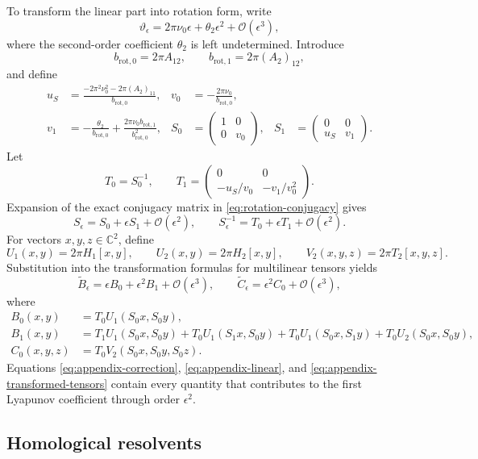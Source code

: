 \documentclass[11pt]{amsart}
\theoremstyle{remark}
\newcommand{\cO}{\mathcal{O}}
\begin{document}
To transform the linear part into rotation form, write
\[
 \vartheta_\epsilon
=2\pi\nu_0\epsilon+\theta_2\epsilon^2+\cO(\epsilon^3),
\]
where the second-order coefficient \(\theta_2\) is left undetermined.
Introduce
\[
 b_{\mathrm{rot},0}=2\pi A_{12},\qquad
 b_{\mathrm{rot},1}=2\pi(A_2)_{12},
\]
and define
\[
\begin{aligned}
u_S&=\frac{-2\pi^2\nu_0^2-2\pi(A_2)_{11}}{b_{\mathrm{rot},0}},
&
v_0&=-\frac{2\pi\nu_0}{b_{\mathrm{rot},0}},\\
v_1&=-\frac{\theta_2}{b_{\mathrm{rot},0}}
+\frac{2\pi\nu_0b_{\mathrm{rot},1}}{b_{\mathrm{rot},0}^2},
&
S_0&=\begin{pmatrix}1&0\\0&v_0\end{pmatrix},
&
S_1&=\begin{pmatrix}0&0\\u_S&v_1\end{pmatrix}.
\end{aligned}
\]
Let
\[
 T_0=S_0^{-1},\qquad
 T_1=
\begin{pmatrix}
0&0\\
-u_S/v_0&-v_1/v_0^2
\end{pmatrix}.
\]
Expansion of the exact conjugacy matrix in
\eqref{eq:rotation-conjugacy} gives
\[
 S_\epsilon=S_0+\epsilon S_1+\cO(\epsilon^2),
 \qquad
 S_\epsilon^{-1}=T_0+\epsilon T_1+\cO(\epsilon^2).
\]
For vectors \(x,y,z\in\mathbb{C}^2\), define
\[
 U_1(x,y)=2\pi H_1[x,y],\qquad
 U_2(x,y)=2\pi H_2[x,y],\qquad
 V_2(x,y,z)=2\pi T_2[x,y,z].
\]
Substitution into the transformation formulas for multilinear tensors yields
\begin{equation}\label{eq:appendix-transformed-tensors}
\widetilde B_\epsilon
=\epsilon B_0+\epsilon^2B_1+\cO(\epsilon^3),
\qquad
\widetilde C_\epsilon
=\epsilon^2C_0+\cO(\epsilon^3),
\end{equation}
where
\[
\begin{aligned}
B_0(x,y)
&=T_0U_1(S_0x,S_0y),\\
B_1(x,y)
&=T_1U_1(S_0x,S_0y)
+T_0U_1(S_1x,S_0y)
+T_0U_1(S_0x,S_1y)
+T_0U_2(S_0x,S_0y),\\
C_0(x,y,z)
&=T_0V_2(S_0x,S_0y,S_0z).
\end{aligned}
\]
Equations \eqref{eq:appendix-correction},
\eqref{eq:appendix-linear}, and \eqref{eq:appendix-transformed-tensors}
contain every quantity that contributes to the first Lyapunov coefficient
through order \(\epsilon^2\).

\subsection{Homological resolvents}
\end{document}
